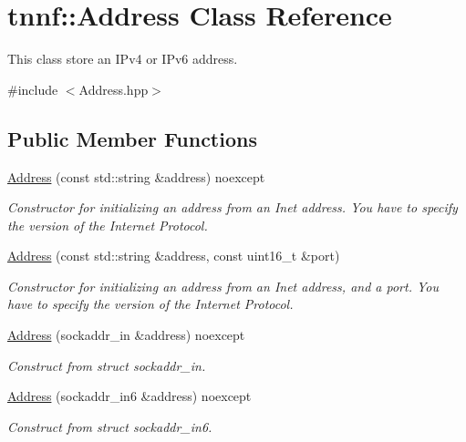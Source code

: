 \hypertarget{classtnnf_1_1_address}{}\section{tnnf\+:\+:Address Class Reference}
\label{classtnnf_1_1_address}


This class store an I\+Pv4 or I\+Pv6 address.  




{\ttfamily \#include $<$Address.\+hpp$>$}

\subsection*{Public Member Functions}
\begin{DoxyCompactItemize}
\item 
\hyperlink{classtnnf_1_1_address_a34057f25713d9d45d845d121b08b73dc}{Address} (const std\+::string \&address) noexcept
\begin{DoxyCompactList}\small\item\em Constructor for initializing an address from an Inet address. You have to specify the version of the Internet Protocol. \end{DoxyCompactList}\item 
\hyperlink{classtnnf_1_1_address_a42a8d0d24d2c51312f3fc312c7cf94e0}{Address} (const std\+::string \&address, const uint16\+\_\+t \&port)
\begin{DoxyCompactList}\small\item\em Constructor for initializing an address from an Inet address, and a port. You have to specify the version of the Internet Protocol. \end{DoxyCompactList}\item 
\hyperlink{classtnnf_1_1_address_a6608dfaf1229b6a4bf755679f5cd58f3}{Address} (sockaddr\+\_\+in \&address) noexcept
\begin{DoxyCompactList}\small\item\em Construct from struct sockaddr\+\_\+in. \end{DoxyCompactList}\item 
\hyperlink{classtnnf_1_1_address_a8b35f234acf1a5571b23c63a5705e5a7}{Address} (sockaddr\+\_\+in6 \&address) noexcept
\begin{DoxyCompactList}\small\item\em Construct from struct sockaddr\+\_\+in6. \end{DoxyCompactList}\item 

\end{DoxyCompactItemize}
